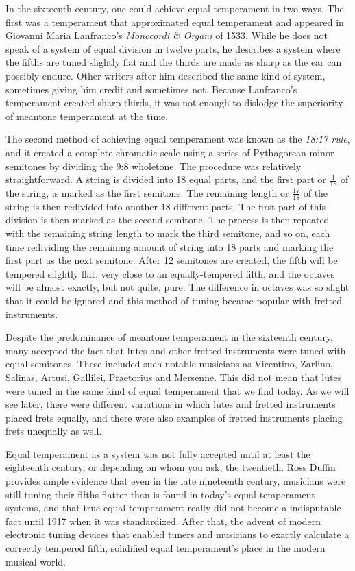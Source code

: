 In the sixteenth century, one could achieve equal temperament in two ways.  The first was
a temperament that approximated equal temperament and appeared in Giovanni Maria
Lanfranco's \textit{Monocordi \& Organi} of 1533. While he does not speak of a system of
equal division in twelve parts, he describes a system where the fifths are tuned slightly
flat and the thirds are made as sharp as the ear can possibly endure. \autocite[45]{MB:1}
Other writers after him described the same kind of system, sometimes giving him credit and
sometimes not.  Because Lanfranco's temperament created sharp thirds, it was not enough to
dislodge the superiority of meantone temperament at the time.

The second method of achieving equal temperament was known as the \textit{18:17 rule}, and
it created a complete chromatic scale using a series of Pythagorean minor semitones by
dividing the 9:8 wholetone.  The procedure was relatively straightforward.  A string is
divided into 18 equal parts, and the first part or $ \frac{1}{18} $ of the string, is
marked as the first semitone.  The remaining length or $ \frac{17}{18} $ of the string is
then redivided into another 18 different parts.  The first part of this division is then
marked as the second semitone.  The process is then repeated with the remaining string
length to mark the third semitone, and so on, each time redividing the remaining amount of
string into 18 parts and marking the first part as the next semitone.  After 12 semitones
are created, the fifth will be tempered slightly flat, very close to an equally-tempered
fifth, and the octaves will be almost exactly, but not quite, pure.  The difference in
octaves was so slight that it could be ignored and this method of tuning became popular
with fretted instruments.

Despite the predominance of meantone temperament in the sixteenth century, many accepted
the fact that lutes and other fretted instruments were tuned with equal semitones.  These
included such notable musicians as Vicentino, Zarlino, Salinas, Artusi, Gallilei,
Praetorius and Mersenne. \autocite[19]{ML:1} This did not mean that lutes were tuned in
the same kind of equal temperament that we find today. As we will see later, there were
different variations in which lutes and fretted instruments placed frets equally, and
there were also examples of fretted instruments placing frets unequally as well.

Equal temperament as a system was not fully accepted until at least the eighteenth
century, or depending on whom you ask, the twentieth.  Ross Duffin provides ample evidence
that even in the late nineteenth century, musicians were still tuning their fifths flatter
than is found in today's equal temperament systems, and that true equal temperament really
did not become a indisputable fact until 1917 when it was standardized.
\autocite[138]{RD:1}  After that, the advent of modern electronic tuning devices that
enabled tuners and musicians to exactly calculate a correctly tempered fifth, solidified
equal temperament's place in the modern musical world.

